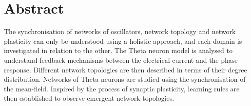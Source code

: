 



\mainmatter


\tableofcontents

\section*{Abstract}
The synchronisation of networks of oscillators, network topology and network plasticity can only be understood using a holistic approach, and each domain is investigated in relation to the other. The Theta neuron model is analysed to understand feedback mechanisms between the electrical current and the phase response. Different network topologies are then described in terms of their degree distribution. Networks of Theta neurons are studied using the synchronisation of the mean-field. Inspired by the process of synaptic plasticity, learning rules are then established to observe emergent network topologies. 

%




\renewcommand{\thepage}{\arabic{page}}









\newpage

\small{}




